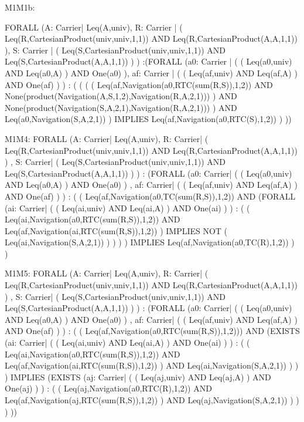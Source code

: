 \begin{verbnobox}[\tiny]
M1M1b:
		
	FORALL (A: Carrier| Leq(A,univ), 
			R: Carrier | ( Leq(R,CartesianProduct(univ,univ,1,1)) AND Leq(R,CartesianProduct(A,A,1,1)) ),
			S: Carrier | ( Leq(S,CartesianProduct(univ,univ,1,1)) AND Leq(S,CartesianProduct(A,A,1,1)) ) )
	:(FORALL (a0: Carrier | ( ( Leq(a0,univ) AND Leq(a0,A) ) AND One(a0) ),
			  af: Carrier | ( ( Leq(af,univ) AND Leq(af,A) ) AND One(af) ) )
		: ( ( ( ( Leq(af,Navigation(a0,RTC(sum(R,S)),1,2)) AND
				  None(product(Navigation(A,S,1,2),Navigation(R,A,2,1))) ) AND
				  None(product(Navigation(S,A,2,1),Navigation(R,A,2,1))) ) AND
				  Leq(a0,Navigation(S,A,2,1)) )
						IMPLIES Leq(af,Navigation(a0,RTC(S),1,2)) ) ))
\end{verbnobox}

\begin{verbnobox}[\tiny]
M1M4:
	FORALL (A: Carrier| Leq(A,univ), 
		   R: Carrier| ( Leq(R,CartesianProduct(univ,univ,1,1)) AND Leq(R,CartesianProduct(A,A,1,1)) ) , 
		   S: Carrier| ( Leq(S,CartesianProduct(univ,univ,1,1)) AND Leq(S,CartesianProduct(A,A,1,1)) ) ) : 
	  (FORALL (a0: Carrier|  (  ( Leq(a0,univ) AND Leq(a0,A) )  AND One(a0) ) , 
			   af: Carrier|  (  ( Leq(af,univ) AND Leq(af,A) )  AND One(af) ) ) : 
		  (  
			 ( Leq(af,Navigation(a0,TC(sum(R,S)),1,2)) AND 
		  	 (FORALL (ai: Carrier|  (  ( Leq(ai,univ) AND Leq(ai,A) ) AND One(ai) ) ) :  
					(  ( Leq(ai,Navigation(a0,RTC(sum(R,S)),1,2)) AND 
					Leq(af,Navigation(ai,RTC(sum(R,S)),1,2)) ) 
					IMPLIES NOT ( Leq(ai,Navigation(S,A,2,1)) )  ) ) )
			IMPLIES Leq(af,Navigation(a0,TC(R),1,2)) ) )
\end{verbnobox}

\begin{verbnobox}[\tiny]
M1M5:
	FORALL (A: Carrier| Leq(A,univ), 
		   R: Carrier| ( Leq(R,CartesianProduct(univ,univ,1,1)) AND Leq(R,CartesianProduct(A,A,1,1)) ) , 
		   S: Carrier| ( Leq(S,CartesianProduct(univ,univ,1,1)) AND Leq(S,CartesianProduct(A,A,1,1)) ) ) : 
	  (FORALL (a0: Carrier|  (  ( Leq(a0,univ) AND Leq(a0,A) )  AND One(a0) ) , 
			   af: Carrier|  (  ( Leq(af,univ) AND Leq(af,A) )  AND One(af) ) ) : 
		  (
			 ( Leq(af,Navigation(a0,RTC(sum(R,S)),1,2))) AND 
		  	 (EXISTS (ai: Carrier|  (  ( Leq(ai,univ) AND Leq(ai,A) ) AND One(ai) ) ) :  
					(  ( Leq(ai,Navigation(a0,RTC(sum(R,S)),1,2)) AND 
						 Leq(af,Navigation(ai,RTC(sum(R,S)),1,2)) ) AND
						 Leq(ai,Navigation(S,A,2,1)) ) ) 
		  )  
		 	IMPLIES (EXISTS (aj: Carrier|  (  ( Leq(aj,univ) AND Leq(aj,A) )  AND One(aj) ) ) : 
				(  ( Leq(aj,Navigation(a0,RTC(R),1,2)) AND 
					 Leq(af,Navigation(aj,RTC(sum(R,S)),1,2)) ) AND 
					 Leq(aj,Navigation(S,A,2,1)) ) ) ) )) 
\end{verbnobox}

